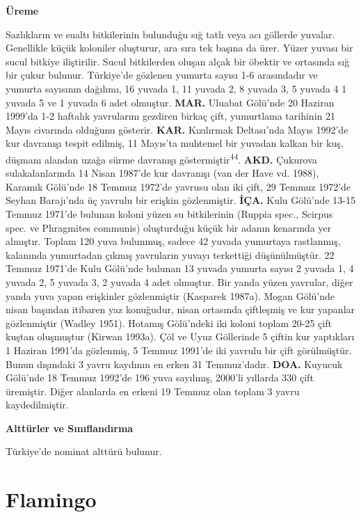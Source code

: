 \documentclass[
  letterpaper,
  DIV=11,
  numbers=noendperiod]{scrreprt}
\begin{document}
\textbf{Üreme}

Sazlıkların ve sualtı bitkilerinin bulunduğu sığ tatlı veya acı göllerde
yuvalar. Genellikle küçük koloniler oluşturur, ara sıra tek başına da
ürer. Yüzer yuvası bir sucul bitkiye iliştirilir. Sucul bitkilerden
oluşan alçak bir öbektir ve ortasında sığ bir çukur bulunur. Türkiye'de
gözlenen yumurta sayısı 1-6 arasındadır ve yumurta sayısının dağılımı,
16 yuvada 1, 11 yuvada 2, 8 yuvada 3, 5 yuvada 4 1 yuvada 5 ve 1 yuvada
6 adet olmuştur. \textbf{MAR.} Uluabat Gölü'nde 20 Haziran 1999'da 1-2
haftalık yavrularını gezdiren birkaç çift, yumurtlama tarihinin 21 Mayıs
civarında olduğunu gösterir. \textbf{KAR.} Kızılırmak Deltası'nda Mayıs
1992'de kur davranışı tespit edilmiş, 11 Mayıs'ta muhtemel bir yuvadan
kalkan bir kuş, düşmanı alandan uzağa sürme davranışı
göstermiştir\textsuperscript{44}. \textbf{AKD.} Çukurova
sulakalanlarında 14 Nisan 1987'de kur davranışı (van der Have vd. 1988),
Karamık Gölü'nde 18 Temmuz 1972'de yavrusu olan iki çift, 29 Temmuz
1972'de Seyhan Barajı'nda üç yavrulu bir erişkin gözlenmiştir.
\textbf{İÇA.} Kulu Gölü'nde 13-15 Temmuz 1971'de bulunan koloni yüzen su
bitkilerinin (Ruppia spec., Scirpus spec. ve Phragmites communis)
oluşturduğu küçük bir adanın kenarında yer almıştır. Toplam 120 yuva
bulunmuş, sadece 42 yuvada yumurtaya rastlanmış, kalanında yumurtadan
çıkmış yavruların yuvayı terkettiği düşünülmüştür. 22 Temmuz 1971'de
Kulu Gölü'nde bulunan 13 yuvada yumurta sayısı 2 yuvada 1, 4 yuvada 2, 5
yuvada 3, 2 yuvada 4 adet olmuştur. Bir yanda yüzen yavrular, diğer
yanda yuva yapan erişkinler gözlenmiştir (Kasparek 1987a). Mogan
Gölü'nde nisan başından itibaren yaz konuğudur, nisan ortasında
çiftleşmiş ve kur yapanlar gözlenmiştir (Wadley 1951). Hotamış
Gölü'ndeki iki koloni toplam 20-25 çift kuştan oluşmuştur (Kirwan
1993a). Çöl ve Uyuz Göllerinde 5 çiftin kur yaptıkları 1 Haziran 1991'da
gözlenmiş, 5 Temmuz 1991'de iki yavrulu bir çift görülmüştür. Bunun
dışındaki 3 yavru kaydının en erken 31 Temmuz'dadır. \textbf{DOA.}
Kuyucuk Gölü'nde 18 Temmuz 1992'de 196 yuva sayılmış, 2000'li yıllarda
330 çift üremiştir. Diğer alanlarda en erkeni 19 Temmuz olan toplam 3
yavru kaydedilmiştir.

\textbf{Alttürler ve Sınıflandırma}

Türkiye'de nominat alttürü bulunur.

\section{Flamingo}\label{flamingo}
\end{document}

